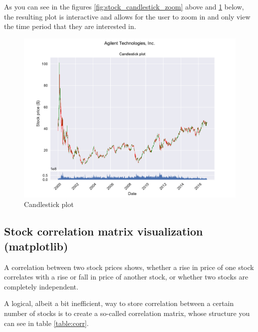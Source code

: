 \documentclass[12pt, a4paper]{article}
\begin{document}
\bgroup
  \inputminted[linenos, breaklines=true, fontsize=\scriptsize, firstnumber=last]{python}{src/stocks/simple/4_candlestick.py}
  \label{listing:ssimp_4_candle}
\egroup

As you can see in the figures \ref{fig:stock_candlestick_zoom} above and \ref{fig:stock_candlestick} below, the resulting plot is interactive and allows for the user to zoom in and only view the time period that they are interested in.

\begin{figure}[H]
    \centering
    \includegraphics[width=\textwidth]{src/stocks/simple/candlestick}
    \caption{Candlestick plot}
    \label{fig:stock_candlestick}
\end{figure}


\newpage
\subsection{Stock correlation matrix visualization (matplotlib)} \label{ssec:stock_corr}

A correlation between two stock prices shows, whether a rise in price of one stock correlates with a rise or fall in price of another stock, or whether two stocks are completely independent.

A logical, albeit a bit inefficient, way to store correlation between a certain number of stocks is to create a so-called correlation matrix, whose structure you can see in table \ref{table:corr}.
\end{document}
